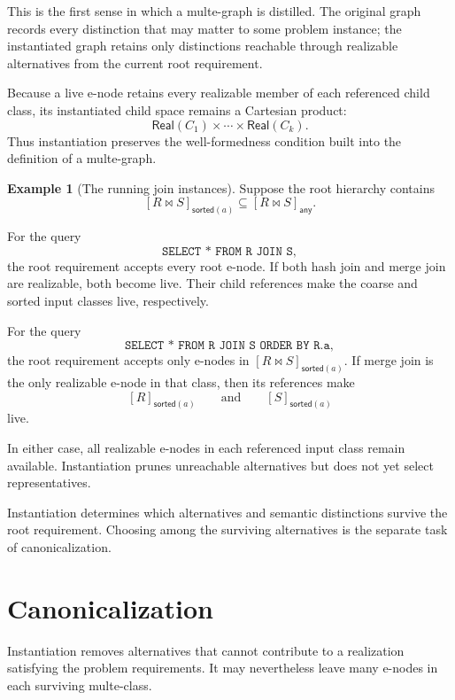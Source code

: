 \documentclass[sigconf,nonacm]{acmart}
\theoremstyle{definition}
\newtheorem{example}[definition]{Example}
\theoremstyle{plain}
\theoremstyle{remark}
\begin{document}
This is the first sense in which a multe-graph is distilled.
The original graph records every distinction that may matter to some
problem instance; the instantiated graph retains only distinctions
reachable through realizable alternatives from the current root
requirement.

Because a live e-node retains every realizable member of each
referenced child class, its instantiated child space remains a
Cartesian product:
\[
\mathsf{Real}(C_1)
\times\cdots\times
\mathsf{Real}(C_k).
\]
Thus instantiation preserves the well-formedness condition built into
the definition of a multe-graph.

\begin{example}[The running join instances]
Suppose the root hierarchy contains
\[
[R\Join S]_{\mathsf{sorted}(a)}
\subseteq
[R\Join S]_{\mathsf{any}}.
\]

For the query
\[
\texttt{SELECT * FROM R JOIN S},
\]
the root requirement accepts every root e-node.
If both hash join and merge join are realizable, both become live.
Their child references make the coarse and sorted input classes live,
respectively.

For the query
\[
\texttt{SELECT * FROM R JOIN S ORDER BY R.a},
\]
the root requirement accepts only e-nodes in
\([R\Join S]_{\mathsf{sorted}(a)}\).
If merge join is the only realizable e-node in that class, then its
references make
\[
[R]_{\mathsf{sorted}(a)}
\qquad\text{and}\qquad
[S]_{\mathsf{sorted}(a)}
\]
live.

In either case, all realizable e-nodes in each referenced input class
remain available.  Instantiation prunes unreachable alternatives but
does not yet select representatives.
\end{example}

Instantiation determines which alternatives and semantic distinctions
survive the root requirement.  Choosing among the surviving
alternatives is the separate task of canonicalization.

\section{Canonicalization}
\label{sec:canonicalization}

Instantiation removes alternatives that cannot contribute to a
realization satisfying the problem requirements.  It may nevertheless
leave many e-nodes in each surviving multe-class.
\end{document}
